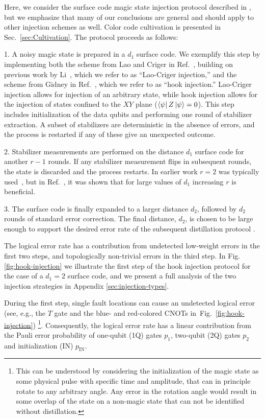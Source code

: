 \documentclass[twocolumn,
notitlepage,
aps,
prx,
floatfix,
superscriptaddress
]{revtex4-2}
\begin{document}
Here, we consider the surface code magic state injection protocol described in \cite{gidney_hook_injection, lao2022magic, li2015magic}, but we emphasize that many of our conclusions are general and should apply to other injection schemes as well. Color code cultivation is presented in Sec.~\ref{sec:Cultivation}. The protocol proceeds as follows:

1. A noisy magic state is prepared in a $d_1$ surface code. We exemplify this step by implementing both the scheme from Lao and Criger in Ref.~\cite{lao2022magic}, building on previous work by Li~\cite{li2015magic}, which we refer to as ``Lao-Criger injection,'' and the scheme from Gidney in Ref.~\cite{gidney_hook_injection}, which we refer to as ``hook injection.''
Lao-Criger injection allows for injection of an arbitrary state, while hook injection allows for the injection of states confined to the $XY$ plane ($\bra{\psi}Z\ket{\psi}=0$). 
This step includes initialization of the data qubits and performing one round of stabilizer extraction. A subset of stabilizers are deterministic in the absence of errors, and the process is restarted if any of these give an unexpected outcome.

2. Stabilizer measurements are performed on the distance $d_1$ surface code for another $r-1$ rounds. If any stabilizer measurement flips in subsequent rounds, the state is discarded and the process restarts. 
In earlier work $r=2$ was typically used~\cite{lao2022magic,li2015magic}, but in Ref.~\cite{gidney_hook_injection}, it was shown that for large values of $d_1$ increasing $r$ is beneficial.

3. The surface code is finally expanded to a larger distance $d_2$,
followed by $d_2$ rounds of standard error correction.
The final distance, $d_2$, is chosen to be large enough to support the desired error rate of the subsequent distillation protocol \cite{litinski2019magic}. 

The logical error rate has a contribution from undetected low-weight errors in the first two steps, and topologically non-trivial errors in the third step.
In Fig. \ref{fig:hook-injection} we illustrate the first step of the hook injection protocol for the case of a $d_1=2$ surface code, and we present a full analysis of the two injection strategies in Appendix \ref{sec:injection-types}.

During the first step, single fault locations can cause an undetected logical error (see, e.g., the $T$ gate and the blue- and red-colored CNOTs in~Fig.~\ref{fig:hook-injection})
\footnote{This can be understood by considering the initialization of the magic state as some physical pulse with specific time and amplitude, that can in principle rotate to any arbitrary angle. Any error in the rotation angle would result in some overlap of the state on a non-magic state that can not be identified without distillation.}.
Consequently, the logical error rate has a linear contribution from the Pauli error probability of one-qubit (1Q) gates $p_1$, two-qubit (2Q) gates $p_2$ and initialization (IN) $p_\text{IN}$.
\end{document}
